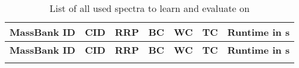 \clearpage
\begin{center}
\begin{longtable}{lr|c|rrr|c}

	\caption{List of all used spectra to learn and evaluate on}\\
	\hline
	\multicolumn{1}{l}{\textbf{MassBank ID}} & \multicolumn{1}{r|}{\textbf{CID}} & \multicolumn{1}{c|}{\textbf{RRP}} & \multicolumn{1}{c}{\textbf{BC}} & \multicolumn{1}{c}{\textbf{WC}} & \multicolumn{1}{c|}{\textbf{TC}} & \multicolumn{1}{c}{\textbf{Runtime in s}} \\ \hline
	\endfirsthead
	\hline
	\multicolumn{1}{l}{\textbf{MassBank ID}} & \multicolumn{1}{r|}{\textbf{CID}} & \multicolumn{1}{c|}{\textbf{RRP}} & \multicolumn{1}{c}{\textbf{BC}} & \multicolumn{1}{c}{\textbf{WC}} & \multicolumn{1}{c|}{\textbf{TC}} & \multicolumn{1}{c}{\textbf{Runtime in s}} \\ \hline
	\endhead
	\endlastfoot
	\label{tab:spectra} %


\end{longtable}
\end{center}
